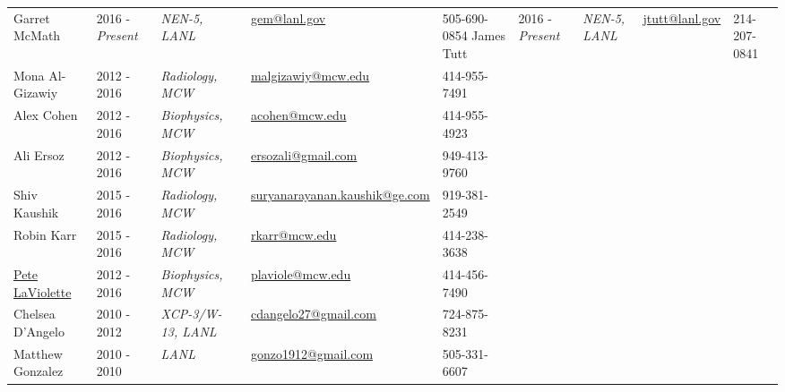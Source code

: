 
\begin{center}
\begin{minipage}{\textwidth}
\begin{tabular}{p{3.2cm}p{2.2cm}p{3.3cm}p{5.0cm}p{2.4cm}}

Garret McMath & 2016 - \emph{Present} & \textit{NEN-5, LANL} & \href{mailto:gem@lanl.gov}{gem@lanl.gov}     & 505-690-0854 
James Tutt    & 2016 - \emph{Present} & \textit{NEN-5, LANL} & \href{mailto:jtutt@lanl.gov}{jtutt@lanl.gov} & 214-207-0841 \\
Mona Al-Gizawiy & 2012 - 2016         & \textit{Radiology, MCW} &  \href{mailto:malgizawiy@mcw.edu}{malgizawiy@mcw.edu} & 414-955-7491 \\
Alex Cohen & 2012 - 2016 & \textit{Biophysics, MCW} &  \href{mailto:acohen@mcw.edu}{acohen@mcw.edu} & 414-955-4923 \\
Ali Ersoz & 2012 - 2016 & \textit{Biophysics, MCW} &  \href{mailto:ersozali@gmail.com}{ersozali@gmail.com} & 949-413-9760 \\
Shiv Kaushik & 2015 - 2016 & \textit{Radiology, MCW} &  \href{mailto:suryanarayanan.kaushik@ge.com}{suryanarayanan.kaushik@ge.com} & 919-381-2549 \\ %
Robin Karr   & 2015 - 2016 & \textit{Radiology, MCW} &  \href{mailto:rkarr@mcw.edu}{rkarr@mcw.edu} & 414-238-3638 \\ %

\href{http://www.mcw.edu/radiology/faculty/PeterLaViolette.htm}{Pete LaViolette} & 2012 - 2016 & \textit{Biophysics, MCW} &  \href{mailto:plaviole@mcw.edu}{plaviole@mcw.edu} & 414-456-7490 \\ %

{Chelsea D'Angelo}\label{chelsea_dangelo} & {2010 - 2012} & \textit{XCP-3/W-13, LANL}& \href{mailto:cdangelo27@gmail.com}{cdangelo27@gmail.com} & 724-875-8231\\ %

{Matthew Gonzalez}\label{matt_gonzo} & {2010 -  2010} & {\textit{LANL}} & \href{mailto:gonzo1912@gmail.com}{gonzo1912@gmail.com} & 505-331-6607\\ %

\end{tabular}
\end{minipage}
\end{center}

